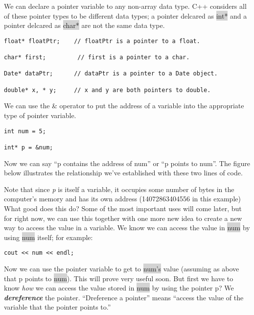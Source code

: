 \documentclass{report}
\begin{document}
We can declare a pointer variable to any non-array data type. C++ considers all of these pointer types to be different data types; a pointer delcared as \colorbox{lightgray}{int*} and a pointer delcared as \colorbox{lightgray}{char*} are not the same data type.
\begin{mdframed}
\begin{verbatim}
float* floatPtr;    // floatPtr is a pointer to a float.

char* first;         // first is a pointer to a char.

Date* dataPtr;      // dataPtr is a pointer to a Date object.

double* x, * y;     // x and y are both pointers to double.
\end{verbatim}
\end{mdframed}
We can use the \& operator to put the address of a variable into the appropriate type of pointer variable.
\begin{mdframed}
\begin{verbatim}
int num = 5;

int* p = &num;
\end{verbatim}
\end{mdframed}
Now we can say ``p contains the address of num'' or ``p points to num''. The figure below illustrates the relationship we've established with these two lines of code.
\begin{figure}[ht]
    \centering
\end{figure}
\newpage
\noindent
Note that since \textit{p} is itself a variable, it occupies some number of bytes in the computer's memory and has its own address (14072863404556 in this example)
\bigbreak \noindent
What good does this do? Some of the most important uses will come later, but for right now, we can use this together with one more new idea to create a new way to access the value in a variable.
\bigbreak \noindent
We know we can access the value in \colorbox{lightgray}{num} by using \colorbox{lightgray}{num} itself; for example:
\begin{mdframed}
\begin{verbatim}
cout << num << endl;
\end{verbatim}
\end{mdframed}
Now we can use the pointer variable to get to \colorbox{lightgray}{num's} value (assuming as above that p points to \colorbox{lightgray}{num}). This will prove very useful soon.
\bigbreak \noindent
But first we have to know \textit{how} we can access the value stored in \colorbox{lightgray}{num} by using the pointer p? We \textit{\textbf{dereference}} the pointer. ``Dreference a pointer'' means ``access the value of the variable that the pointer points to.''
\end{document}
